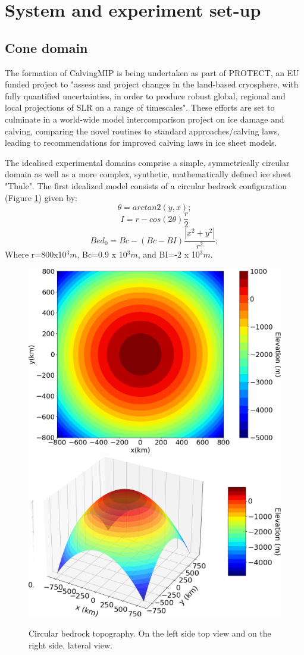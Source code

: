 \documentclass{article}
\begin{document}
\section{System and experiment set-up}
\subsection{Cone domain}

The formation of CalvingMIP is being undertaken as part of PROTECT, an EU funded project to "assess and project changes in the land-based cryosphere, with fully quantified uncertainties, in order to produce robust global, regional and local projections of SLR on a range of timescales". These efforts are set to culminate in a world-wide model intercomparison project on ice damage and calving, comparing the novel routines to standard approaches/calving laws, leading to recommendations for improved calving laws in ice sheet models.

The idealised experimental domains comprise a simple, symmetrically circular domain as well as a more complex, synthetic, mathematically defined ice sheet "Thule". The first idealized model consists of a circular bedrock configuration (Figure \ref{circular_topo_top}) given by:
\begin{equation}
	\theta=arctan2(y,x);
\end{equation}
\begin{equation}
	I=r-cos(2\theta)\frac{r}{2}
\end{equation}
\begin{equation}
	Bed_0=Bc-(Bc-BI)\frac{|x^2+y^2|}{r^2};
\end{equation}
Where r=800x10$^3 m$, Bc=0.9 x 10$^3 m$, and BI=-2 x 10$^3 m$. 
\begin{figure}[!h]
	\centering
	\includegraphics[width=0.45\linewidth]{../fig/circular_topo_top.png}
	\includegraphics[width=0.45\linewidth]{../fig/circular_topo_jet}
	\caption{Circular bedrock topography. On the left side top view and on the right side, lateral view.}
	\label{circular_topo_top}
\end{figure}
\end{document}

